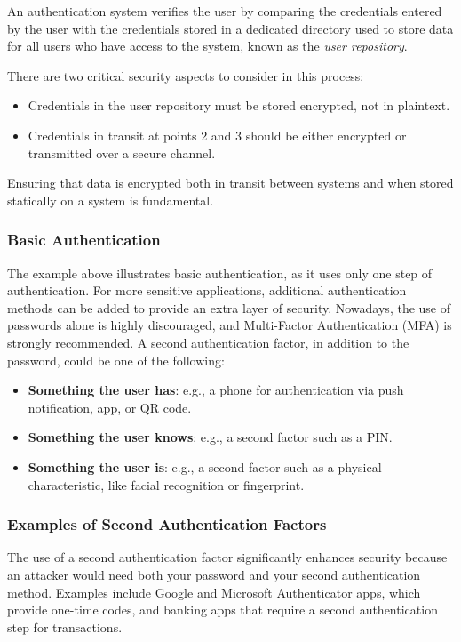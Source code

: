 An authentication system verifies the user by comparing the credentials entered by the user with the credentials stored in a dedicated directory used to store data for all users who have access to the system, known as the \textit{user repository}.

There are two critical security aspects to consider in this process:

\begin{itemize}
    \item Credentials in the user repository must be stored encrypted, not in plaintext.
    \item Credentials in transit at points 2 and 3 should be either encrypted or transmitted over a secure channel.
\end{itemize}

Ensuring that data is encrypted both in transit between systems and when stored statically on a system is fundamental.

\subsubsection{Basic Authentication}
The example above illustrates basic authentication, as it uses only one step of authentication. For more sensitive applications, additional authentication methods can be added to provide an extra layer of security. Nowadays, the use of passwords alone is highly discouraged, and Multi-Factor Authentication (MFA) is strongly recommended. A second authentication factor, in addition to the password, could be one of the following:

\begin{itemize}
    \item \textbf{Something the user has}: e.g., a phone for authentication via push notification, app, or QR code.
    \item \textbf{Something the user knows}: e.g., a second factor such as a PIN.
    \item \textbf{Something the user is}: e.g., a second factor such as a physical characteristic, like facial recognition or fingerprint.
\end{itemize}

\subsubsection{Examples of Second Authentication Factors}
The use of a second authentication factor significantly enhances security because an attacker would need both your password and your second authentication method. Examples include Google and Microsoft Authenticator apps, which provide one-time codes, and banking apps that require a second authentication step for transactions.

